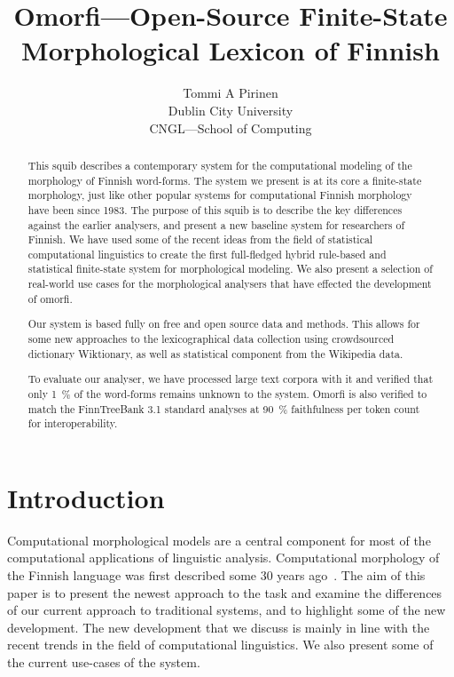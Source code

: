 \documentclass[a4paper,12pt]{article}
\title{Omorfi---Open-Source Finite-State Morphological Lexicon of Finnish}
\author{Tommi A Pirinen \\
    Dublin City University\\
    CNGL---School of Computing}
\date{}
\begin{document}
\maketitle
\begin{abstract}

    This squib describes a contemporary system for the computational modeling of
    the morphology of Finnish word-forms. The system we present is at its core a
    finite-state morphology, just like other popular systems for computational
    Finnish morphology have been since 1983.  The purpose of this squib is to
    describe the key differences against the earlier analysers, and present
    a new baseline system for researchers of Finnish. We have used
    some of the recent ideas from the field of statistical computational
    linguistics to create the first full-fledged hybrid rule-based and
    statistical finite-state system for morphological modeling. We also present
    a selection of real-world use cases for the morphological analysers that
    have effected the development of omorfi.

    Our system is based fully on free and open source data and methods. This
    allows for some new approaches to the lexicographical data collection
    using crowd\-sour\-ced dictionary Wiktionary, as well as statistical
    component from the Wikipedia data.

    To evaluate our analyser, we have processed large text corpora with it
    and verified that only 1~\% of the word-forms remains unknown to the
    system. Omorfi is also verified to match the FinnTreeBank 3.1 standard
    analyses at 90~\% faithfulness per token count for interoperability.
\end{abstract}
\section{Introduction}

Computational morphological models are a central component for most of the
computational applications of linguistic analysis. Computational morphology
of the Finnish language was first described some 30 years
ago~\citep{koskenniemi1983twolevel}. The aim of this paper is to present the
newest approach to the task and examine the differences of our current approach
to traditional systems, and to highlight some of the new development. The
new development that we discuss is mainly in line with the recent trends in
the field of computational linguistics. We also present some of the current
use-cases of the system.
\end{document}
